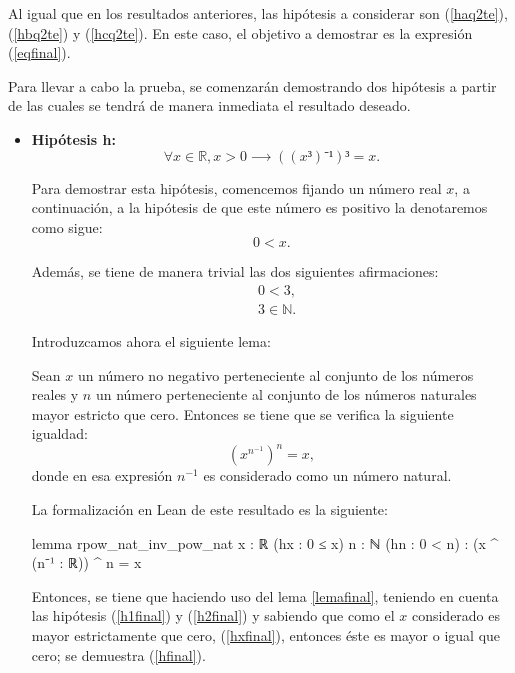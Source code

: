 \begin{demostracion}
  Al igual que en los resultados anteriores, las hipótesis a considerar son
  (\ref{haq2te}), (\ref{hbq2te}) y (\ref{hcq2te}). En este caso, el
  objetivo a demostrar es la expresión (\ref{eqfinal}).

  Para llevar a cabo la prueba, se comenzarán demostrando dos hipótesis
  a partir de las cuales se tendrá de manera inmediata el resultado
  deseado.
  \begin{itemize}
  \item \textbf{Hipótesis h:}
    \begin{equation}\label{hfinal}\tag{h}
      ∀x∈ ℝ, x>0 ⟶((x³)⁻¹)³ =x.
    \end{equation}

    Para demostrar esta hipótesis, comencemos fijando un número real \(x\),
    a continuación, a la hipótesis de que este número es positivo la
    denotaremos como sigue:
    \begin{equation}\label{hxfinal}\tag{hx}
      0<x.
    \end{equation}

    Además, se tiene de manera trivial las dos siguientes afirmaciones:
    \begin{align}
      &0<3,\label{h1final}\tag{h1}\\
      &3∈ℕ. \label{h2final}\tag{h2}
    \end{align}

    Introduzcamos ahora el siguiente lema:
    \begin{lema}\label{lemafinal}
      Sean \(x\) un número no negativo perteneciente al conjunto de los
      números reales y \(n\) un número perteneciente al conjunto de los
      números naturales mayor estricto que cero. Entonces se tiene que
      se verifica la siguiente igualdad:
      \begin{equation}
        (x^{n^{-1}})^n=x,
      \end{equation}
      donde en esa expresión \(n^{-1} \) es considerado como un número
      natural.
    \end{lema}
    La formalización en Lean de este resultado es la siguiente:
    \begin{leancode}
      lemma rpow_nat_inv_pow_nat {x : ℝ} (hx : 0 ≤ x) {n : ℕ} (hn : 0 < n) :
      (x ^ (n⁻¹ : ℝ)) ^ n = x
    \end{leancode}

    Entonces, se tiene que haciendo uso del lema \ref{lemafinal}, teniendo
    en cuenta las hipótesis (\ref{h1final}) y (\ref{h2final}) y sabiendo
    que como el \(x\) considerado es mayor estrictamente que cero,
    (\ref{hxfinal}), entonces éste es mayor o igual que cero; se demuestra
    (\ref{hfinal}).    
    

\end{itemize}
\end{demostracion}
